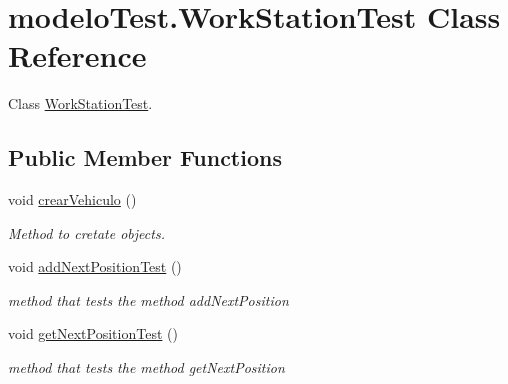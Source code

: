 \hypertarget{classmodelo_test_1_1_work_station_test}{}\section{modelo\+Test.\+Work\+Station\+Test Class Reference}
\label{classmodelo_test_1_1_work_station_test}


Class \mbox{\hyperlink{classmodelo_test_1_1_work_station_test}{Work\+Station\+Test}}.  


\subsection*{Public Member Functions}
\begin{DoxyCompactItemize}
\item 
\mbox{\label{classmodelo_test_1_1_work_station_test_aecfdd5044fa61ddf699bd4c69a34f1c4}} 
void \mbox{\hyperlink{classmodelo_test_1_1_work_station_test_aecfdd5044fa61ddf699bd4c69a34f1c4}{crear\+Vehiculo}} ()
\begin{DoxyCompactList}\small\item\em Method to cretate objects. \end{DoxyCompactList}\item 
\mbox{\label{classmodelo_test_1_1_work_station_test_a83492675ceba62ebf1d0b93f6d931710}} 
void \mbox{\hyperlink{classmodelo_test_1_1_work_station_test_a83492675ceba62ebf1d0b93f6d931710}{add\+Next\+Position\+Test}} ()
\begin{DoxyCompactList}\small\item\em method that tests the method add\+Next\+Position \end{DoxyCompactList}\item 
\mbox{\label{classmodelo_test_1_1_work_station_test_ae28b0566e3f07704bebe1d089ab50ccb}} 
void \mbox{\hyperlink{classmodelo_test_1_1_work_station_test_ae28b0566e3f07704bebe1d089ab50ccb}{get\+Next\+Position\+Test}} ()
\begin{DoxyCompactList}\small\item\em method that tests the method get\+Next\+Position \end{DoxyCompactList}\item 
\mbox{\label{classmodelo_test_1_1_work_station_test_a5dd6aa55ae1ade521d71169e2db70e0d}} 

\end{DoxyCompactItemize}

